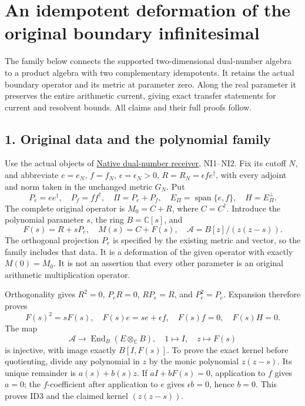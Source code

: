 \documentclass[
]{article}
\begin{document}
\section{An idempotent deformation of the original boundary
infinitesimal}\label{an-idempotent-deformation-of-the-original-boundary-infinitesimal}

The family below connects the supported two-dimensional dual-number
algebra to a product algebra with two complementary idempotents. It
retains the actual boundary operator and its metric at parameter zero.
Along the real parameter it preserves the entire arithmetic current,
giving exact transfer statements for current and resolvent bounds. All
claims and their full proofs follow.

\subsection{1. Original data and the polynomial
family}\label{original-data-and-the-polynomial-family}

Use the actual objects of
\href{https://github.com/KokunoYumeto/zeta-function-research-reader/blob/6af54ea3c8ef99127af327f3103e086c68d482c2/workbenches/splitzero-tandem/branches/identity-absorber-square/NATIVE_DUAL_NUMBER_RECEIVER.md}{Native
dual-number receiver}, NI1--NI2. Fix its cutoff \(N\), and abbreviate
\(e=e_N\), \(f=f_N\), \(\epsilon=\epsilon_N>0\),
\(R=R_N=\epsilon fe^\dagger\), with every adjoint and norm taken in the
unchanged metric \(G_N\). Put \[
P_e=ee^\dagger,\quad P_f=ff^\dagger,\quad
\Pi=P_e+P_f,\quad E_\Pi=\operatorname{span}\{e,f\},\quad H=E_\Pi^\perp.
\] The complete original operator is \(M_0=C+R\), where \(C=C^\dagger\).
Introduce the polynomial parameter \(s\), the ring \(B=\mathbb C[s]\),
and \[
F(s)=R+sP_e,\quad M(s)=C+F(s),\quad
\mathcal A=B[z]/(z(z-s)).
\tag{ID1}
\] The orthogonal projection \(P_e\) is specified by the existing metric
and vector, so the family includes that data. It is a deformation of the
given operator with exactly \(M(0)=M_0\). It is not an assertion that
every other parameter is an original arithmetic multiplication operator.

Orthogonality gives \(R^2=0\), \(P_eR=0\), \(RP_e=R\), and
\(P_e^2=P_e\). Expansion therefore proves \[
F(s)^2=sF(s),\quad F(s)e=se+\epsilon f,
\quad F(s)f=0,\quad F(s)H=0.
\tag{ID2}
\] The map \[
\mathcal A\longrightarrow\operatorname{End}_B(E\otimes_{\mathbb C}B),
\quad 1\longmapsto I,\quad z\longmapsto F(s)
\tag{ID3}
\] is injective, with image exactly \(B[I,F(s)]\). To prove the exact
kernel before quotienting, divide any polynomial in \(z\) by the monic
polynomial \(z(z-s)\). Its unique remainder is \(a(s)+b(s)z\). If
\(aI+bF(s)=0\), application to \(f\) gives \(a=0\); the
\(f\)-coefficient after application to \(e\) gives \(\epsilon b=0\),
hence \(b=0\). This proves ID3 and the claimed kernel \((z(z-s))\).
\end{document}
